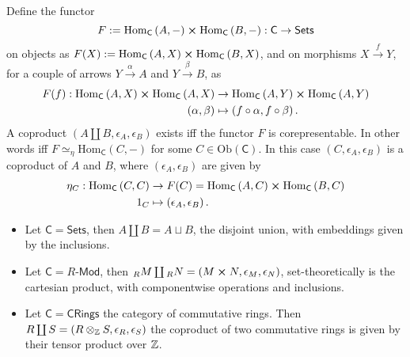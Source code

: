 \begin{prop}
	Define the functor 
	\begin{equation}
	F := \mathrm{Hom}_{\mathsf{C}} \left( A, - \right) \cross \mathrm{Hom}_{\mathsf{C}} \left( B, - \right): \mathsf{C} \to \mathsf{Sets}
	\end{equation} 
	on objects as $F(X) := \mathrm{Hom}_{\mathsf{C}} \left( A, X \right) \cross \mathrm{Hom}_{\mathsf{C}} \left( B, X \right)$, and on morphisms $X \xrightarrow{f} Y$, for a couple of arrows $Y \xrightarrow{\alpha} A$ and $Y \xrightarrow{\beta} B$, as
	\begin{align}
		F(f): \mathrm{Hom}_{\mathsf{C}} \left( A, X \right) \cross \mathrm{Hom}_{\mathsf{C}} \left( A, X \right) &\to \mathrm{Hom}_{\mathsf{C}} \left( A, Y \right) \cross \mathrm{Hom}_{\mathsf{C}} \left( A, Y \right) \\
		\left(\alpha, \beta\right) &\mapsto \left(f \circ \alpha, f \circ \beta \right)
	.\end{align} 
	A coproduct $\left(A \coprod B, \epsilon_A, \epsilon_B \right)$ exists iff the functor $F$ is corepresentable.
	In other words iff $F \simeq_\eta \mathrm{Hom}_{\mathsf{C}} \left( C, - \right)$
	for some $C \in \mathrm{Ob} \left(\mathsf{C}\right)$.
	In this case $\left(C, \epsilon_A, \epsilon_B\right)$ is a coproduct of $A$ and $B$,
	where $\left(\epsilon_A, \epsilon_B\right)$ are given by
	\begin{align}
		\eta_C: \mathrm{Hom}_{\mathsf{C}} \left( C, C \right) &\to F(C) = \mathrm{Hom}_{\mathsf{C}} \left( A, C \right) \cross \mathrm{Hom}_{\mathsf{C}} \left( B, C \right)  \\
		1_C &\mapsto \left(\epsilon_A, \epsilon_B\right)
	.\end{align} 
\end{prop} 

\begin{ex}\leavevmode\vspace{-.2\baselineskip}
	\begin{itemize}
		\item Let $\mathsf{C} = \mathsf{Sets}$, then $A \coprod B = A \sqcup B$, the disjoint union, with embeddings given by the inclusions.
		\item Let $\mathsf{C} = R\text{-}\mathsf{Mod}$, then ${}_RM \coprod {}_RN = \left(M \cross N, \epsilon_M, \epsilon_N\right)$, set-theoretically is the cartesian product, with componentwise operations and inclusions.
		\item Let $\mathsf{C} = \mathsf{CRings}$ the category of commutative rings.
			Then $R \coprod S = \left(R \otimes_{\mathbb{Z}} S, \epsilon_R, \epsilon_S\right)$ the coproduct of two commutative rings is given by their tensor product over $\mathbb{Z}$.
	\end{itemize}
\end{ex} 


